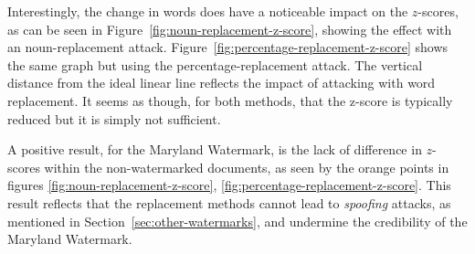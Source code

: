 \documentclass{l4proj}
\theoremstyle{definition}
\begin{document}
    Interestingly, the change in words does have a noticeable impact on the $z$-scores, as can be seen in Figure~\ref{fig:noun-replacement-z-score}, showing the effect with an noun-replacement attack. Figure~\ref{fig:percentage-replacement-z-score} shows the same graph but using the percentage-replacement attack. The vertical distance from the ideal linear line reflects the impact of attacking with word replacement. It seems as though, for both methods, that the z-score is typically reduced but it is simply not sufficient. 
    
    A positive result, for the Maryland Watermark, is the lack of difference in $z$-scores within the non-watermarked documents, as seen by the orange points in figures \ref{fig:noun-replacement-z-score}, \ref{fig:percentage-replacement-z-score}. This result reflects that the replacement methods cannot lead to \emph{spoofing} attacks, as mentioned in Section~\ref{sec:other-watermarks}, and undermine the credibility of the Maryland Watermark.
    
\end{document}
